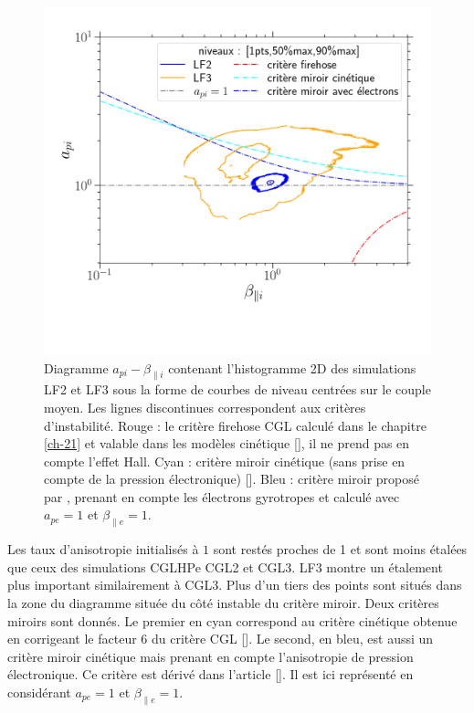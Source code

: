\begin{figure}[!ht]
 \centering
\includegraphics[width=1\linewidth,trim=0cm 2cm 1cm 1cm, clip=true]{./Part_3/images_ch4/diag_simu_LF}
\cprotect\caption{Diagramme $a_{pi}-\beta_{\parallel i}$ contenant l'histogramme \acs{2D} des simulations LF2 et LF3 sous la forme de courbes de niveau centrées sur le couple moyen. Les lignes discontinues correspondent aux critères d'instabilité. Rouge : le critère firehose CGL calculé dans le chapitre \ref{ch-21} et valable dans les modèles cinétique [\cite{hunana_introductory_2019}], il ne prend pas en compte l'effet \acs{Hall}. Cyan : critère miroir cinétique (sans prise en compte de la pression électronique) [\cite{hunana_introductory_2019}]. Bleu : critère miroir proposé par \cite{kuznetsov_mirror_2012}, prenant en compte les électrons gyrotropes et calculé avec $a_{pe} = 1$ et $\beta_{\parallel e } = 1$.}
\label{fig:diag_simu_LF}
\end{figure} 

Les taux d'anisotropie initialisés à $\num{1}$ sont restés proches de 1 et sont moins étalées que ceux des simulations \acs{CGLHPe} CGL2 et CGL3. LF3 montre un étalement plus important similairement à CGL3. Plus d'un tiers des points sont situés dans la zone du diagramme située du côté instable du critère miroir. Deux critères miroirs sont donnés. Le premier en cyan correspond au critère cinétique obtenue en corrigeant le facteur 6 du critère CGL [\cite{galeev_mhd_1983,ferriere_mixed_2002,hunana_introductory_2019}]. Le second, en bleu, est aussi un critère miroir cinétique mais prenant en compte l'anisotropie de pression électronique. Ce critère est dérivé dans l'article [\cite{kuznetsov_mirror_2012}]. Il est ici représenté en considérant $a_{pe} = 1$ et $\beta_{\parallel e } = 1$. 

